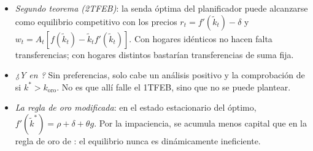 \documentclass[11pt]{article}
\begin{document}
\begin{itemize}
\begin{itemize}
  \item \emph{Segundo teorema (2TFEB)}: la senda óptima del planificador puede alcanzarse como equilibrio competitivo con los precios $r_t=f'(\tilde k_t)-\delta$ y $w_t=A_t[f(\tilde k_t)-\tilde k_tf'(\tilde k_t)]$. Con hogares idénticos no hacen falta transferencias; con hogares distintos bastarían transferencias de suma fija.
  \item \emph{¿Y en ?} Sin preferencias, solo cabe un análisis positivo y la comprobación de si $k^*>k_{\mathrm{oro}}$. No es que allí falle el 1TFEB, sino que no se puede plantear.
  \item \emph{La regla de oro modificada}: en el estado estacionario del óptimo, $f'(\tilde k^*)=\rho+\delta+\theta g$. Por la impaciencia, se acumula menos capital que en la regla de oro de : el equilibrio nunca es dinámicamente ineficiente.
  \end{itemize}
\end{itemize}
\end{document}
